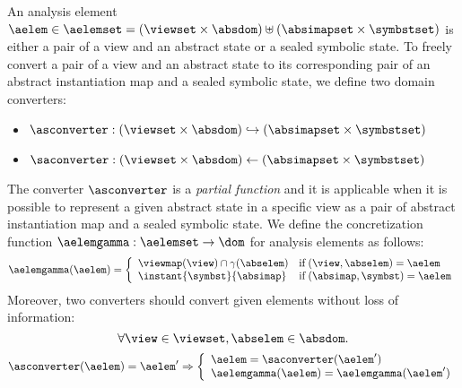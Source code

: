 An analysis element $\aelem \in \aelemset = (\viewset \times \absdom) \uplus
(\absimapset \times \symbstset)$ is either a pair of a view and an abstract
state or a sealed symbolic state.  To freely convert a pair of a view and an
abstract state to its corresponding pair of an abstract instantiation map and a
sealed symbolic state, we define two domain converters: \begin{itemize} \item
$\asconverter: (\viewset \times \absdom) \hookrightarrow (\absimapset \times
\symbstset)$ \item $\saconverter: (\viewset \times \absdom) \leftarrow
(\absimapset \times \symbstset)$ \end{itemize} The converter $\asconverter$ is a
\textit{partial function} and it is applicable when it is possible to represent
a given abstract state in a specific view as a pair of abstract instantiation
map and a sealed symbolic state.  We define the concretization function
$\aelemgamma: \aelemset \rightarrow \dom$ for analysis elements as follows:
\[
  \aelemgamma(\aelem) = \left\{
    \begin{array}{ll}
      \viewmap(\view) \cap \gamma(\abselem) & \text{if} \; (\view, \abselem) = \aelem\\
      \instant{\symbst}{\absimap} & \text{if} \; (\absimap, \symbst) = \aelem\\
    \end{array}
  \right.
\]
Moreover, two converters should convert given elements without loss of
information:
\[
  \forall \view \in \viewset, \abselem \in \absdom.
\]
\[
  \asconverter(\aelem) = \aelem' \Rightarrow \left\{
  \begin{array}{l}
    \aelem = \saconverter(\aelem')\\
    \aelemgamma(\aelem) = \aelemgamma(\aelem')\\
  \end{array}
  \right.
\]


